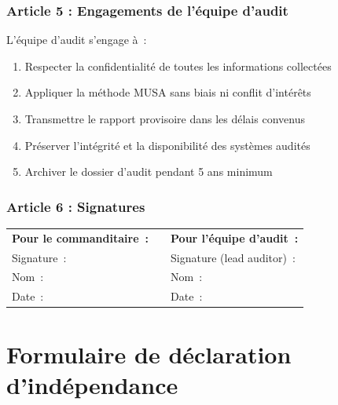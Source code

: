 \documentclass[12pt,a4paper,oneside]{report}
\begin{document}
\subsection*{Article 5 : Engagements de l'\'equipe d'audit}

\begin{encadre}
L'\'equipe d'audit s'engage \`a~:
\begin{enumerate}[leftmargin=*, itemsep=3pt]
\item Respecter la confidentialit\'e de toutes les informations collect\'ees
\item Appliquer la m\'ethode MUSA sans biais ni conflit d'int\'er\^ets
\item Transmettre le rapport provisoire dans les d\'elais convenus
\item Pr\'eserver l'int\'egrit\'e et la disponibilit\'e des syst\`emes audit\'es
\item Archiver le dossier d'audit pendant 5 ans minimum
\end{enumerate}
\end{encadre}

\subsection*{Article 6 : Signatures}

\begin{encadre}
\vspace{0.5cm}
\begin{tabular}{p{6cm}p{1cm}p{6cm}}
\textbf{Pour le commanditaire~:} & & \textbf{Pour l'\'equipe d'audit~:} \\[1cm]
Signature~: \dotfill & & Signature (lead auditor)~: \dotfill \\[0.5cm]
Nom~: \dotfill & & Nom~: \dotfill \\[0.5cm]
Date~: \dotfill & & Date~: \dotfill \\
\end{tabular}
\end{encadre}

\newpage

\chapter{Formulaire de d\'eclaration d'ind\'ependance}
\label{annexe:independance}
\end{document}
